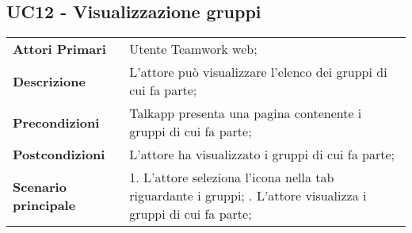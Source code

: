 \subsection{UC12 - Visualizzazione gruppi}
	\begin{center}
	\bgroup
	\def\arraystretch{1.8}     
	\begin{longtable}{  p{4cm} | p{9.5cm} } 
		\textbf{Attori Primari} & Utente Teamwork web; \\ 
		\textbf{Descrizione} &  L'attore può visualizzare l'elenco dei gruppi di cui fa parte; \\ 
		\textbf{Precondizioni}  & Talkapp presenta una pagina contenente i gruppi di cui fa parte; \\
		\textbf{Postcondizioni} & L'attore ha visualizzato i gruppi di cui fa parte; \\ 
		\textbf{Scenario principale} & 
		1. L'attore seleziona l'icona nella tab riguardante i gruppi; \newline
		2. L'attore visualizza i gruppi di cui fa parte;
	\end{longtable}
	\egroup
\end{center}

